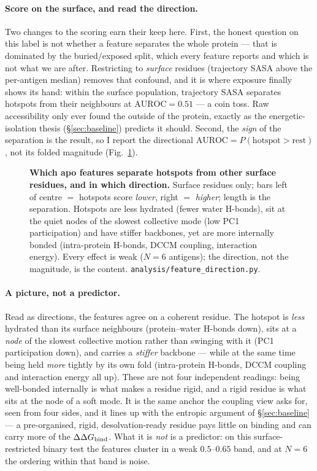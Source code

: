 \paragraph{Score on the surface, and read the direction.} Two changes to the scoring earn their keep
here. First, the honest question on this label is not whether a feature separates the whole protein ---
that is dominated by the buried/exposed split, which every feature reports and which is not what we are
after. Restricting to \emph{surface} residues (trajectory SASA above the per-antigen median) removes
that confound, and it is where exposure finally shows its hand: within the surface population,
trajectory SASA separates hotspots from their neighbours at $\mathrm{AUROC}=0.51$ --- a coin toss.
Raw accessibility only ever found the outside of the protein, exactly as the energetic-isolation thesis
(\S\ref{sec:baseline}) predicts it should. Second, the \emph{sign} of the separation is the result, so I
report the directional $\mathrm{AUROC}=P(\text{hotspot}>\text{rest})$, not its folded magnitude
(Fig.~\ref{fig:feature-direction}).

\begin{figure}[H]\centering
{}
\caption{\textbf{Which apo features separate hotspots from other surface residues, and in which
direction.} Surface residues only; bars left of centre $=$ hotspots score \emph{lower}, right $=$
\emph{higher}; length is the separation. Hotspots are less hydrated (fewer water H-bonds), sit at the
quiet nodes of the slowest collective mode (low PC1 participation) and have stiffer backbones, yet are
more internally bonded (intra-protein H-bonds, DCCM coupling, interaction energy). Every effect is weak
($N=6$ antigens); the direction, not the magnitude, is the content. \texttt{analysis/feature\_direction.py}.}
\label{fig:feature-direction}
\end{figure}

\paragraph{A picture, not a predictor.} Read as directions, the features agree on a coherent residue.
The hotspot is \emph{less} hydrated than its surface neighbours (protein--water H-bonds down), sits at a
\emph{node} of the slowest collective motion rather than swinging with it (PC1 participation down), and
carries a \emph{stiffer} backbone --- while at the same time being held \emph{more} tightly by its own
fold (intra-protein H-bonds, DCCM coupling and interaction energy all up). These are not four
independent readings: being well-bonded internally is what makes a residue rigid, and a rigid residue is
what sits at the node of a soft mode. It is the same anchor the coupling view asks for, seen from four
sides, and it lines up with the entropic argument of \S\ref{sec:baseline} --- a pre-organised, rigid,
desolvation-ready residue pays little on binding and can carry more of the $\Delta\Delta G_{\mathrm{bind}}$. What it is \emph{not}
is a predictor: on this surface-restricted binary test the features cluster in a weak $0.5$--$0.65$
band, and at $N=6$ the ordering within that band is noise.

